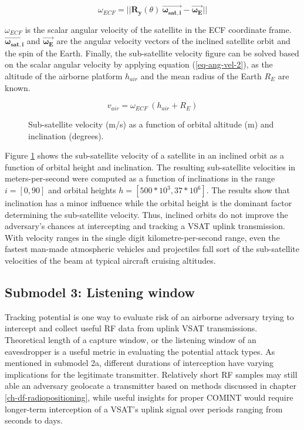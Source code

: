 \documentclass[english, 12pt, a4paper, elec, utf8, a-1b, online]{aaltothesis}
\begin{document}
\begin{equation*}
  \omega_{ECF} =
  ||\bm{R_y}(\theta)\ \bm{\vec{\omega_{sat, i}}} - \bm{\vec{\omega_{E}}}||
\end{equation*}

$\omega_{ECF}$ is the scalar angular velocity of the satellite in the ECF coordinate frame.
$\bm{\vec{\omega_{sat, i}}}$ and $\bm{\vec{\omega_{E}}}$ are the angular velocity vectors of the inclined satellite orbit and the spin of the Earth.
Finally, the sub-satellite velocity figure can be solved based on the scalar angular velocity by applying equation (\ref{eq-ang-vel-2}), as the altitude of the airborne platform $h_{air}$ and the mean radius of the Earth $R_E$ are known.

\begin{equation}
  v_{air} = \omega_{ECF}\ (h_{air} + R_E)
\end{equation}

\begin{figure}[h]
  \centering
  
  \caption{Sub-satellite velocity (m/s) as a function of orbital altitude (m) and inclination (degrees).}
  \label{fig-subsat-velocity-inclined}
\end{figure}
Figure \ref{fig-subsat-velocity-inclined} shows the sub-satellite velocity of a satellite in an inclined orbit as a function of orbital height and inclination.
The resulting sub-satellite velocities in meters-per-second were computed as a function of inclinations in the range $i = [0,90]$ and orbital heights $h = [500*10^3, 37*10^6]$.
The results show that inclination has a minor influence while the orbital height is the dominant factor determining the sub-satellite velocity.
Thus, inclined orbits do not improve the adversary's chances at intercepting and tracking a VSAT uplink transmission.
With velocity ranges in the single digit kilometre-per-second range, even the fastest man-made atmospheric vehicles and projectiles fall sort of the sub-satellite velocities of the beam at typical aircraft cruising altitudes.

\subsection{Submodel 3: Listening window} \label{ch-results-submodel-3-window}
Tracking potential is one way to evaluate risk of an airborne adversary trying to intercept and collect useful RF data from uplink VSAT transmissions.
Theoretical length of a capture window, or the listening window of an eavesdropper is a useful metric in evaluating the potential attack types.
As mentioned in submodel 2a, different durations of interception have varying implications for the legitimate transmitter.
Relatively short RF samples may still able an adversary geolocate a transmitter based on methods discussed in chapter \ref{ch-df-radiopositioning}, while useful insights for proper COMINT would require longer-term interception of a VSAT's uplink signal over periods ranging from seconds to days. %
\end{document}
